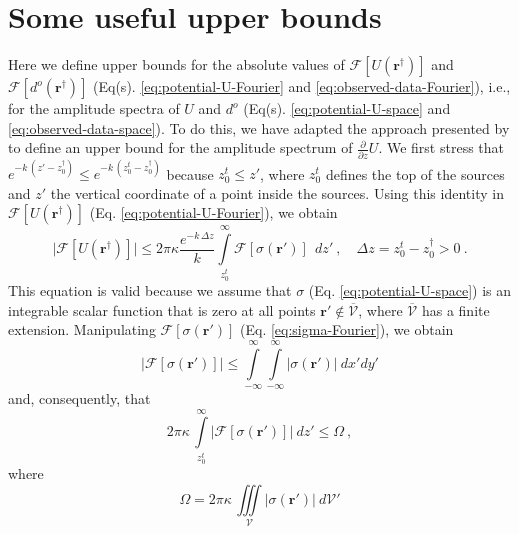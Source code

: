 \section{Some useful upper bounds}
\label{app:upper-bounds}

Here we define upper bounds for the absolute values
of $\mathcal{F} [ U(\mathbf{r}^{\dagger}) ]$ and $\mathcal{F} [ d^{o}(\mathbf{r}^{\dagger}) ]$ 
(Eq(s). \ref{eq:potential-U-Fourier} and \ref{eq:observed-data-Fourier}), 
i.e., for the amplitude spectra of $U$ and $d^{o}$ 
(Eq(s). \ref{eq:potential-U-space} and \ref{eq:observed-data-space}). 
To do this, we have adapted the approach presented by
\cite{bhattacharyya1967} to define an upper bound for the amplitude spectrum of 
$\tfrac{\partial}{\partial z} U$. 
We first stress that 
$e^{- k \, (z' - z^{\dagger}_{0})} \le e^{- k \, (z^{t}_{0} - z^{\dagger}_{0})}$ because
$z^{t}_{0} \le z'$, where $z^{t}_{0}$ defines the top of the sources and $z'$ the vertical
coordinate of a point inside the sources. Using this identity in  
$\mathcal{F} [ U(\mathbf{r}^{\dagger}) ]$ (Eq. \ref{eq:potential-U-Fourier}), we obtain
\begin{equation}
	\vert \mathcal{F} [ U(\mathbf{r}^{\dagger}) ] \vert \le 2 \pi \kappa 
	\frac{e^{- k \, \Delta z}}{k}
	\int\limits_{z^{t}_{0}}^{\infty}
	\mathcal{F} [ \sigma(\mathbf{r}') ] \:
	\: dz' \: , \quad \Delta z = z^{t}_{0} - z^{\dagger}_{0} > 0 \: .
	\label{eq:potential-U-spectrum-bound1}
\end{equation}
This equation is valid because we assume that $\sigma$ (Eq. \ref{eq:potential-U-space}) 
is an integrable scalar function that is zero at all points $\mathbf{r}' \notin \overline{\mathcal{V}}$, 
where $\overline{\mathcal{V}}$ has a finite extension. 
Manipulating $\mathcal{F} [ \sigma(\mathbf{r}') ]$ (Eq. \ref{eq:sigma-Fourier}), 
we obtain
\begin{equation}
	\vert \mathcal{F} [ \sigma(\mathbf{r}') ] \vert \le
	\int\limits_{-\infty}^{\infty}\int\limits_{-\infty}^{\infty}
	\vert \sigma(\mathbf{r}') \vert 
	\: dx'dy'
	\label{eq:sigma-spectrum-bound}
\end{equation}
and, consequently, that
\begin{equation}
	2 \pi \kappa \, 
	\int\limits_{z^{t}_{0}}^{\infty}
	\vert \mathcal{F} [ \sigma(\mathbf{r}') ] \vert
	\: dz' \le \Omega \: ,
	\label{eq:Omega-bound}
\end{equation}
where
\begin{equation}
	\Omega = 2 \pi \kappa \, \iiint\limits_{\mathcal{V}}
	\vert \sigma(\mathbf{r}') \vert 
	\: d\mathcal{V}'
	\label{eq:Omega}
\end{equation}
